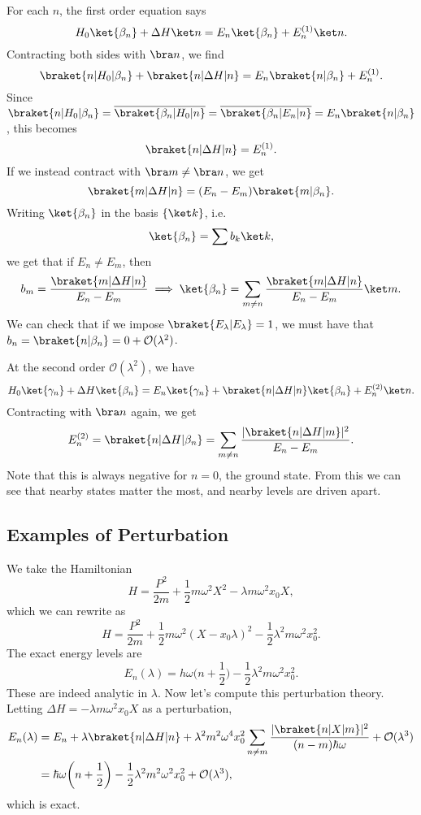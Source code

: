 \documentclass[12pt]{article}
\begin{document}
For each $n$, the first order equation says
\[
	H_0 \ket{\beta_n} + \Delta H \ket n = E_n \ket{\beta_n} + E_n^{(1)} \ket n.
\]
Contracting both sides with $\bra n$, we find
\[
	\braket{n|H_0|\beta_n} + \braket{n|\Delta H|n} = E_n \braket{n|\beta_n} + E_n^{(1)}.
\]
Since $\braket{n|H_0|\beta_n} = \overline{\braket{\beta_n|H_0|n}} = \overline{\braket{\beta_n|E_n|n}} = E_n \braket{n|\beta_n}$, this becomes
\[
	\braket{n|\Delta H|n} = E_n^{(1)}.
\]
If we instead contract with $\bra m \neq \bra n$, we get
\[
	\braket{m|\Delta H| n} = (E_n - E_m) \braket{m|\beta_n}.
\]
Writing $\ket{\beta_n}$ in the basis $\{ \ket k\}$, i.e.
\[
	\ket{\beta_n} = \sum b_k \ket k,
\]
we get that if $E_n \neq E_m$, then
\[
	b_m = \frac{\braket{m|\Delta H|n}}{E_n - E_m} \implies \ket{\beta_n} = \sum_{m \neq n} \frac{\braket{m|\Delta H|n}}{E_n - E_m} \ket m.
\]
We can check that if we impose $\braket{E_\lambda|E_\lambda} = 1$, we must have that $b_n = \braket{n|\beta_n} = 0 + \mathcal{O}(\lambda^2)$.

At the second order $\mathcal{O}(\lambda^2)$, we have
\[
	H_0 \ket{\gamma_n} + \Delta H \ket{\beta_n} = E_n \ket{\gamma_n} + \braket{n|\Delta H| n} \ket{\beta_n} + E_n^{(2)} \ket n.
\]
Contracting with $\bra n$ again, we get
\[
	E_n^{(2)} = \braket{n|\Delta H| \beta_n} = \sum_{m \neq n} \frac{|\braket{n|\Delta H|m}|^2}{E_n - E_m}.
\]
Note that this is always negative for $n = 0$, the ground state. From this we can see that nearby states matter the most, and nearby levels are driven apart.

\subsection{Examples of Perturbation}
\label{sub:ex_pert}

We take the Hamiltonian
\[
H = \frac{P^2}{2m} + \frac{1}{2} m \omega^2 X^2 - \lambda m \omega^2 x_0 X,
\]
which we can rewrite as
\[
H = \frac{P^2}{2m} + \frac{1}{2} m \omega^2 (X - x_0 \lambda)^2 - \frac{1}{2} \lambda^2 m \omega^2 x_0^2.
\]
The exact energy levels are
\[
E_n(\lambda) = h \omega\biggl(n + \frac{1}{2}\biggr) - \frac{1}{2} \lambda^2 m \omega^2 x_0^2.
\]
These are indeed analytic in $\lambda$. Now let's compute this perturbation theory. Letting $\Delta H = - \lambda m \omega^2 x_0 X$ as a perturbation,
\begin{align*}
	E_n(\lambda) &= E_n + \lambda \braket{n|\Delta H|n} + \lambda^2 m^2 \omega^{4} x_0^2 \sum_{n \neq m} \frac{|\braket{n|X|m}|^2}{(n-m)\hbar \omega} + \mathcal{O}(\lambda^3) \\
	&= \hbar \omega \biggl(n + \frac{1}{2} \biggr) - \frac{1}{2} \lambda^2 m^2 \omega^2 x_0^2 + \mathcal{O}(\lambda^3),
\end{align*}
which is exact.
\end{document}
